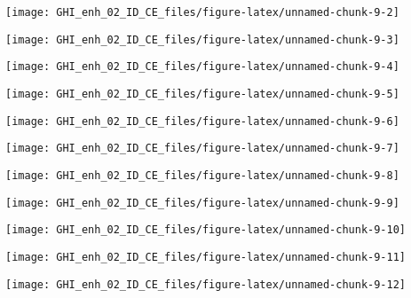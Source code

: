 \documentclass[
  10pt,
  a4paper,oneside]{article}
\begin{document}
\begin{center}\texttt{[image: GHI\_enh\_02\_ID\_CE\_files/figure-latex/unnamed-chunk-9-2]} \end{center}

\begin{center}\texttt{[image: GHI\_enh\_02\_ID\_CE\_files/figure-latex/unnamed-chunk-9-3]} \end{center}

\begin{center}\texttt{[image: GHI\_enh\_02\_ID\_CE\_files/figure-latex/unnamed-chunk-9-4]} \end{center}

\begin{center}\texttt{[image: GHI\_enh\_02\_ID\_CE\_files/figure-latex/unnamed-chunk-9-5]} \end{center}

\begin{center}\texttt{[image: GHI\_enh\_02\_ID\_CE\_files/figure-latex/unnamed-chunk-9-6]} \end{center}

\begin{center}\texttt{[image: GHI\_enh\_02\_ID\_CE\_files/figure-latex/unnamed-chunk-9-7]} \end{center}

\begin{center}\texttt{[image: GHI\_enh\_02\_ID\_CE\_files/figure-latex/unnamed-chunk-9-8]} \end{center}

\begin{center}\texttt{[image: GHI\_enh\_02\_ID\_CE\_files/figure-latex/unnamed-chunk-9-9]} \end{center}

\begin{center}\texttt{[image: GHI\_enh\_02\_ID\_CE\_files/figure-latex/unnamed-chunk-9-10]} \end{center}

\begin{center}\texttt{[image: GHI\_enh\_02\_ID\_CE\_files/figure-latex/unnamed-chunk-9-11]} \end{center}

\begin{center}\texttt{[image: GHI\_enh\_02\_ID\_CE\_files/figure-latex/unnamed-chunk-9-12]} \end{center}
\end{document}
